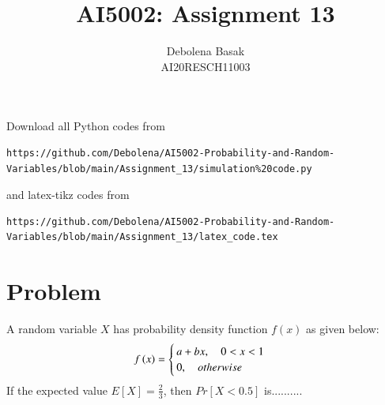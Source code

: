 \documentclass[journal,12pt,twocolumn]{IEEEtran}
\begin{document}
     \def\rightbox#1{\makebox[0in][r]{#1}}
     \def\centbox#1{\makebox[0in]{#1}}
     \def\topbox#1{\raisebox{-\baselineskip}[0in][0in]{#1}}
     \def\midbox#1{\raisebox{-0.5\baselineskip}[0in][0in]{#1}}
\vspace{3cm}
\title{AI5002: Assignment 13}
\author{Debolena Basak\\ AI20RESCH11003}
\maketitle
\newpage
\bigskip
\renewcommand{\thefigure}{\theenumi}
\renewcommand{\thetable}{\theenumi}
Download all Python codes from 
\begin{lstlisting}
https://github.com/Debolena/AI5002-Probability-and-Random-Variables/blob/main/Assignment_13/simulation%20code.py
\end{lstlisting}
%
and latex-tikz codes from 
%
\begin{lstlisting}
https://github.com/Debolena/AI5002-Probability-and-Random-Variables/blob/main/Assignment_13/latex_code.tex
\end{lstlisting}
\section{Problem}
A random variable $X$ has probability density
function $f(x)$ as given below:
\begin{align}
    f\left(x\right) = 
    \begin{cases}
    a + bx  , \quad 0<x<1 \\
    0, \quad otherwise \label{fx}
    \end{cases}
\end{align}
If the expected value $E[X] = \frac{2}{3}$, then $Pr[X<0.5]$ is..........
\end{document}
